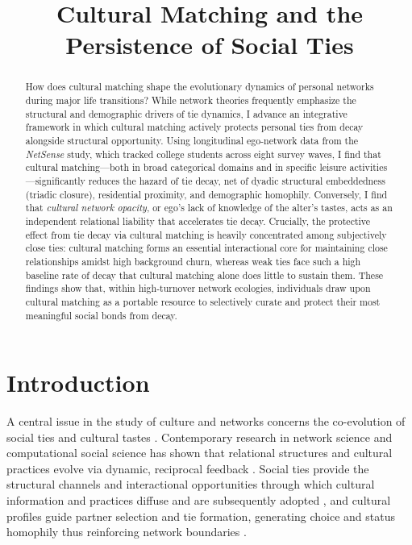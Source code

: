 \documentclass[12pt,letterpaper]{article}
\title{Cultural Matching and the Persistence of Social Ties}
\author{}
\date{}
\begin{document}
\maketitle

\begin{abstract}
How does cultural matching shape the evolutionary dynamics of personal networks during major life transitions? While network theories frequently emphasize the structural and demographic drivers of tie dynamics, I advance an integrative framework in which cultural matching actively protects personal ties from decay alongside structural opportunity. Using longitudinal ego-network data from the \textit{NetSense} study, which tracked college students across eight survey waves, I find that cultural matching---both in broad categorical domains and in specific leisure activities---significantly reduces the hazard of tie decay, net of dyadic structural embeddedness (triadic closure), residential proximity, and demographic homophily. Conversely, I find that \textit{cultural network opacity}, or ego's lack of knowledge of the alter's tastes, acts as an independent relational liability that accelerates tie decay. Crucially, the protective effect from tie decay via cultural matching is heavily concentrated among subjectively close ties: cultural matching forms an essential interactional core for maintaining close relationships amidst high background churn, whereas weak ties face such a high baseline rate of decay that cultural matching alone does little to sustain them. These findings show that, within high-turnover network ecologies, individuals draw upon cultural matching as a portable resource to selectively curate and protect their most meaningful social bonds from decay.
\end{abstract}

\newpage
\section{Introduction}\label{introduction}

A central issue in the study of culture and networks concerns the co-evolution of social ties and cultural tastes \citep{lizardo2006, edelmann2014cultural-a77}. Contemporary research in network science and computational social science has shown that relational structures and cultural practices evolve via dynamic, reciprocal feedback \citep{mark1998b, mcpherson2004blau-9fe, lewis2018}. Social ties provide the structural channels and interactional opportunities through which cultural information and practices diffuse and are subsequently adopted \citep{lazarsfeld1954, carley1991, borgatti2005}, and cultural profiles guide partner selection and tie formation, generating choice and status homophily thus reinforcing network boundaries \citep{dimaggio1987, mcpherson2001, shalizi2011,stark2020meeting}. 
\end{document}
